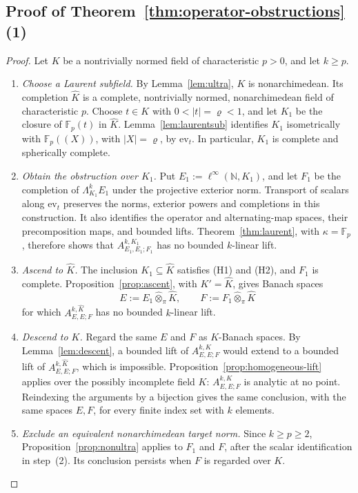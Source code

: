 \documentclass[11pt]{amsart}
\theoremstyle{definition}
\theoremstyle{remark}
\numberwithin{equation}{section}
\newcommand{\N}{\mathbb N}
\newcommand{\F}{\mathbb F}
\newcommand{\linf}{\ell^\infty}
\newcommand{\abs}[1]{\lvert #1\rvert}
\newcommand{\Kh}{\widehat K}
\theoremstyle{plain}
\theoremstyle{definition}
\theoremstyle{plain}
\begin{document}
\subsection{Proof of Theorem~\ref{thm:operator-obstructions}(1)}
\begin{proof}
Let $K$ be a nontrivially normed field of characteristic $p>0$, and let $k\ge p$.
\begin{enumerate}
\item \emph{Choose a Laurent subfield.} By Lemma~\ref{lem:ultra}, $K$ is nonarchimedean. Its completion $\Kh$ is
a complete, nontrivially normed, nonarchimedean field of characteristic $p$. Choose $t\in K$ with
$0<\abs t=\varrho<1$, and let $K_1$ be the closure of $\F_p(t)$ in $\Kh$. Lemma~\ref{lem:laurentsub} identifies $K_1$
isometrically with $\F_p((X))$, with $\abs X=\varrho$, by $\mathrm{ev}_t$. In particular, $K_1$ is complete and
spherically complete.
\item \emph{Obtain the obstruction over $K_1$.} Put $E_1:=\linf(\N,K_1)$, and let $F_1$ be the completion of
$\Lambda^k_{K_1}E_1$ under the projective exterior norm. Transport of scalars along $\mathrm{ev}_t$ preserves
the norms, exterior powers and completions in this construction. It also identifies the operator and
alternating-map spaces, their precomposition maps, and bounded lifts. Theorem~\ref{thm:laurent}, with
$\kappa=\F_p$, therefore shows that $A^{k,K_1}_{E_1,E_1;F_1}$ has no bounded $k$\nobreakdash-linear lift.
\item \emph{Ascend to $\Kh$.} The inclusion $K_1\subseteq\Kh$ satisfies (H1) and (H2), and $F_1$ is complete.
Proposition~\ref{prop:ascent}, with $K'=\Kh$, gives Banach spaces
\[
E:=E_1\widehat\otimes_\pi\Kh,\qquad F:=F_1\widehat\otimes_\pi\Kh
\]
for which $A^{k,\Kh}_{E,E;F}$ has no bounded $k$\nobreakdash-linear lift.
\item \emph{Descend to $K$.} Regard the same $E$ and $F$ as $K$\nobreakdash-Banach spaces. By
Lemma~\ref{lem:descent}, a bounded lift of $A^{k,K}_{E,E;F}$ would extend to a bounded lift of
$A^{k,\Kh}_{E,E;F}$, which is impossible. Proposition~\ref{prop:homogeneous-lift} applies over the possibly incomplete
field $K$: $A^{k,K}_{E,E;F}$ is analytic at no point. Reindexing the arguments by a bijection gives the same conclusion, with the same spaces $E,F$, for every finite index set with $k$ elements.
\item \emph{Exclude an equivalent nonarchimedean target norm.} Since $k\ge p\ge2$, Proposition~\ref{prop:nonultra}
applies to $F_1$ and $F$, after the scalar identification in step~(2). Its conclusion persists when $F$ is
regarded over $K$.\qedhere
\end{enumerate}
\end{proof}
\end{document}
